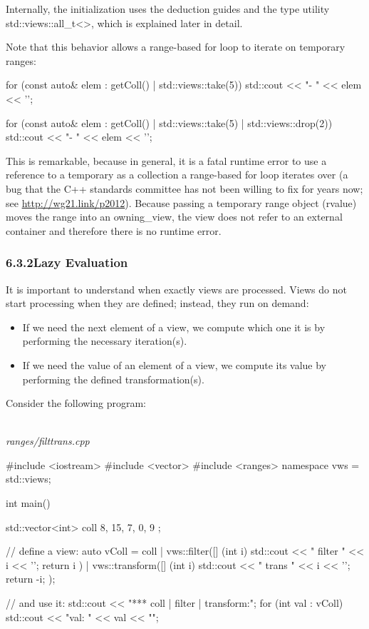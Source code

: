 Internally, the initialization uses the deduction guides and the type utility std::views::all\_t<>, which is explained later in detail.

Note that this behavior allows a range-based for loop to iterate on temporary ranges:

\begin{cpp}
for (const auto& elem : getColl() | std::views::take(5)) {
	std::cout << "- " << elem << '\n';
}

for (const auto& elem : getColl() | std::views::take(5) | std::views::drop(2)) {
	std::cout << "- " << elem << '\n';
}
\end{cpp}

This is remarkable, because in general, it is a fatal runtime error to use a reference to a temporary as a collection a range-based for loop iterates over (a bug that the C++ standards committee has not been willing to fix for years now; see \url{http://wg21.link/p2012}). Because passing a temporary range object (rvalue) moves the range into an owning\_view, the view does not refer to an external container and therefore there is no runtime error.

\subsubsection*{ 6.3.2\hspace{0.2cm}Lazy Evaluation}

It is important to understand when exactly views are processed. Views do not start processing when they are defined; instead, they run on demand:

\begin{itemize}
\item
If we need the next element of a view, we compute which one it is by performing the necessary iteration(s).

\item
If we need the value of an element of a view, we compute its value by performing the defined transformation(s).
\end{itemize}

Consider the following program:

\noindent
\hspace*{\fill} \\ %
\textit{ranges/filttrans.cpp}

\begin{cpp}
#include <iostream>
#include <vector>
#include <ranges>
namespace vws = std::views;

int main()
{
	std::vector<int> coll{ 8, 15, 7, 0, 9 };
	
	// define a view:
	auto vColl = coll
				| vws::filter([] (int i) {
					std::cout << " filter " << i << '\n';
					return i %
				})
				| vws::transform([] (int i) {
					std::cout << " trans " << i << '\n';
					return -i;
				});
				
	// and use it:
	std::cout << "*** coll | filter | transform:\n";
	for (int val : vColl) {
		std::cout << "val: " << val << "\n\n";
	}
}
\end{cpp}

